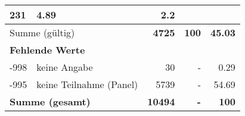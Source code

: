 \begin{longtable}{lXrrr}
       \num{231} &
       \num[round-mode=places,round-precision=2]{4.89} &
         \num[round-mode=places,round-precision=2]{2.2} \\
     \midrule
     \multicolumn{2}{l}{Summe (gültig)} &
       \textbf{\num{4725}} &
     \textbf{\num{100}} &
       \textbf{\num[round-mode=places,round-precision=2]{45.03}} \\
     \multicolumn{5}{l}{\textbf{Fehlende Werte}}\\
       -998 &
       keine Angabe &
         \num{30} &
        - &
         \num[round-mode=places,round-precision=2]{0.29} \\
       -995 &
       keine Teilnahme (Panel) &
         \num{5739} &
        - &
         \num[round-mode=places,round-precision=2]{54.69} \\
     \midrule
     \multicolumn{2}{l}{\textbf{Summe (gesamt)}} &
          \textbf{\num{10494}} &
        \textbf{-} &
        \textbf{\num{100}} \\
     \bottomrule
     \end{longtable}
     
